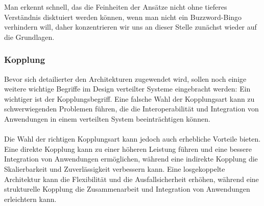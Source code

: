 \documentclass[../vs-script-first-v01.tex]{subfiles}
\begin{document}
Man erkennt schnell, das die Feinheiten der Ansätze nicht ohne tieferes Verständnis disktuiert werden können, wenn man nicht ein Buzzword-Bingo verhindern will, daher konzentrieren wir uns an dieser Stelle zunächst wieder auf die Grundlagen.

\subsubsection{Kopplung}
Bevor sich detailierter den Architekturen zugewendet wird, sollen noch einige weitere wichtige Begriffe im Design verteilter Systeme eingebracht werden: Ein wichtiger ist der Kopplungsbegriff. 
Eine falsche Wahl der Kopplungsart kann zu schwerwiegenden Problemen führen, die die Interoperabilität und Integration von Anwendungen in einem verteilten System beeinträchtigen können.
\\\\
Die Wahl der richtigen Kopplungsart kann jedoch auch erhebliche Vorteile bieten. Eine direkte Kopplung kann zu einer höheren Leistung führen und eine bessere Integration von Anwendungen ermöglichen, während eine indirekte Kopplung die Skalierbarkeit und Zuverlässigkeit verbessern kann. Eine losgekoppelte Architektur kann die Flexibilität  und die Ausfallsicherheit erhöhen, während eine strukturelle Kopplung die Zusammenarbeit und Integration von Anwendungen erleichtern kann.

\end{document}
